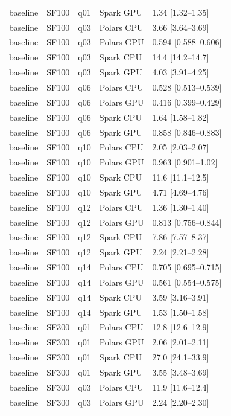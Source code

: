 \begin{longtable}{lllll}
baseline & SF100 & q01 & Spark GPU & 1.34 [1.32--1.35] \\
baseline & SF100 & q03 & Polars CPU & 3.66 [3.64--3.69] \\
baseline & SF100 & q03 & Polars GPU & 0.594 [0.588--0.606] \\
baseline & SF100 & q03 & Spark CPU & 14.4 [14.2--14.7] \\
baseline & SF100 & q03 & Spark GPU & 4.03 [3.91--4.25] \\
baseline & SF100 & q06 & Polars CPU & 0.528 [0.513--0.539] \\
baseline & SF100 & q06 & Polars GPU & 0.416 [0.399--0.429] \\
baseline & SF100 & q06 & Spark CPU & 1.64 [1.58--1.82] \\
baseline & SF100 & q06 & Spark GPU & 0.858 [0.846--0.883] \\
baseline & SF100 & q10 & Polars CPU & 2.05 [2.03--2.07] \\
baseline & SF100 & q10 & Polars GPU & 0.963 [0.901--1.02] \\
baseline & SF100 & q10 & Spark CPU & 11.6 [11.1--12.5] \\
baseline & SF100 & q10 & Spark GPU & 4.71 [4.69--4.76] \\
baseline & SF100 & q12 & Polars CPU & 1.36 [1.30--1.40] \\
baseline & SF100 & q12 & Polars GPU & 0.813 [0.756--0.844] \\
baseline & SF100 & q12 & Spark CPU & 7.86 [7.57--8.37] \\
baseline & SF100 & q12 & Spark GPU & 2.24 [2.21--2.28] \\
baseline & SF100 & q14 & Polars CPU & 0.705 [0.695--0.715] \\
baseline & SF100 & q14 & Polars GPU & 0.561 [0.554--0.575] \\
baseline & SF100 & q14 & Spark CPU & 3.59 [3.16--3.91] \\
baseline & SF100 & q14 & Spark GPU & 1.53 [1.50--1.58] \\
baseline & SF300 & q01 & Polars CPU & 12.8 [12.6--12.9] \\
baseline & SF300 & q01 & Polars GPU & 2.06 [2.01--2.11] \\
baseline & SF300 & q01 & Spark CPU & 27.0 [24.1--33.9] \\
baseline & SF300 & q01 & Spark GPU & 3.55 [3.48--3.69] \\
baseline & SF300 & q03 & Polars CPU & 11.9 [11.6--12.4] \\
baseline & SF300 & q03 & Polars GPU & 2.24 [2.20--2.30] \\

\end{longtable}
